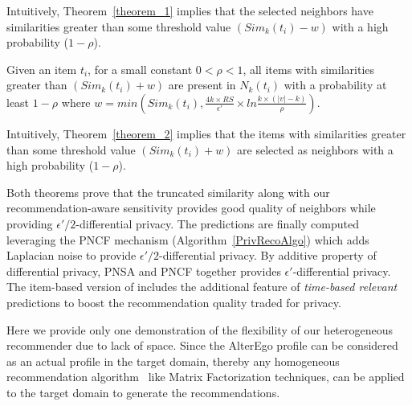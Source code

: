 Intuitively, Theorem~\ref{theorem_1} implies that the selected neighbors have similarities greater than some threshold value $(Sim_k(t_i) -w)$ with a high probability ($1 - \rho$).

\begin{theorem}
\label{theorem_2}
Given an item $t_i$, for a small constant   $0 <\rho <1$, all items with similarities greater than $(Sim_k(t_i) +w)$ are present in $N_k(t_i)$ with a probability at least $1-\rho$ where $w=min(Sim_k(t_i), \frac{4k \times RS}{\epsilon'} \times ln\frac{k \times (|v| - k)}{\rho})$.
\end{theorem}

Intuitively, Theorem~\ref{theorem_2} implies that the items with similarities greater than some threshold value $(Sim_k(t_i) +w)$ are selected as neighbors with a high probability ($1 - \rho$).

Both theorems prove that the truncated similarity along with our recommendation-aware sensitivity provides good quality of neighbors while providing $\epsilon'/2$-differential privacy. The predictions are finally computed leveraging the PNCF mechanism (Algorithm~\ref{PrivRecoAlgo}) which adds Laplacian noise to provide $\epsilon'/2$-differential privacy. By additive property of differential privacy, PNSA and PNCF together provides $\epsilon'$-differential privacy. The item-based version of \crossrec includes the additional feature of \emph{time-based relevant} predictions to boost the recommendation quality traded for privacy.

Here we provide only one demonstration of the flexibility of our heterogeneous recommender due to lack of space. Since the AlterEgo profile can be considered as an actual profile in the target domain, thereby any homogeneous recommendation algorithm~\cite{adomavicius2005toward} like Matrix Factorization techniques, can be applied to the target domain to generate the recommendations.


